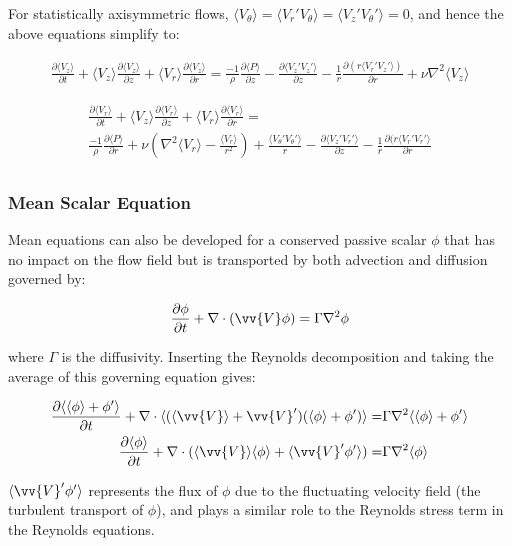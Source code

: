 \documentclass[10pt]{article}
\newcommand{\beq}{\begin{equation}}
\newcommand{\eeq}{\end{equation}}
\newcommand{\beqa}{\begin{equation}\begin{aligned}}
\newcommand{\eeqa}{\end{aligned}\end{equation}}
\newcommand{\la}{\langle}
\newcommand{\ra}{\rangle}
\begin{document}
\begin{flushleft}
For statistically axisymmetric flows, \(\la V_{\theta}\ra=\la V_r'V_{\theta}\ra=\la V_z'V_{\theta}'\ra=0\), and hence the above equations simplify to:

\beqa
\frac{\partial \la V_z\ra}{\partial t}+\la V_z\ra\frac{\partial \la V_z\ra}{\partial z}+\la V_r\ra\frac{\partial \la V_z\ra}{\partial r}=\frac{-1}{\rho}\frac{\partial \la P\ra}{\partial z}-\frac{\partial \la V_z'V_z'\ra}{\partial z}-\frac{1}{r}\frac{\partial (r\la V_r'V_z'\ra)}{\partial r}+\nu\nabla^2\la V_z\ra
\eeqa

\beqa
\frac{\partial \la V_r\ra}{\partial t}+\la V_z\ra\frac{\partial \la V_r\ra}{\partial z}+\la V_r\ra\frac{\partial\la V_r\ra}{\partial r}=\\
\frac{-1}{\rho}\frac{\partial \la P\ra}{\partial r}+\nu\left(\nabla^2 \la V_r\ra-\frac{\la V_r\ra}{r^2}\right)+\frac{\la V_{\theta}'V_{\theta}'\ra}{r}-\frac{\partial \la V_z'V_r'\ra}{\partial z}-\frac{1}{r}\frac{\partial(r\la V_r'V_r'\ra}{\partial r}\\
\eeqa





\subsubsection{Mean Scalar Equation}
Mean equations can also be developed for a conserved passive scalar \(\phi\) that has no impact on the flow field but is transported by both advection and diffusion governed by:

\beq
\frac{\partial\phi}{\partial t}+\nabla\cdot(\vv{V}\phi)=\Gamma\nabla^2\phi
\eeq

where \(\Gamma\) is the diffusivity. Inserting the Reynolds decomposition and taking the average of this governing equation gives:

\beqa
\frac{\partial\la\la\phi\ra+\phi'\ra}{\partial t}+\nabla\cdot\la(\la\vv{V}\ra+\vv{V}')(\la\phi\ra+\phi')\ra=&\Gamma\nabla^2\la\la\phi\ra+\phi'\ra\\
\frac{\partial\la\phi\ra}{\partial t}+\nabla\cdot(\la\vv{V}\ra\la\phi\ra+\la\vv{V}'\phi'\ra)=&\Gamma\nabla^2\la\phi\ra\\
\eeqa

\(\la\vv{V}'\phi'\ra\) represents the flux of \(\phi\) due to the fluctuating velocity field (the turbulent transport of \(\phi\)), and plays a similar role to the Reynolds stress term in the Reynolds equations. 








\end{flushleft}
\end{document}
